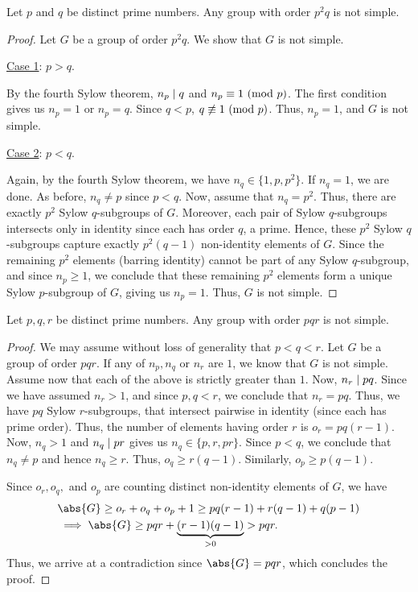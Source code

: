 \begin{theorem} \label{thm:simple-order-ppq}
    Let $p$ and $q$ be distinct prime numbers. Any group with order $p^2q$ is not simple.
\end{theorem}
\begin{proof}
    Let $G$ be a group of order $p^2q$. We show that $G$ is not simple.
    
    \underline{Case 1}: $p > q$.
    
    By the fourth Sylow theorem, $n_p \mid q$ and $n_p \equiv 1 \ (\mathrm{mod}\ p)$. The first condition gives us $n_p = 1$ or $n_p = q$. Since $q < p$, $q \not\equiv 1\ (\mathrm{mod}\ p)$. Thus, $n_p = 1$, and $G$ is not simple.
    
    \underline{Case 2}: $p < q$.
    
    Again, by the fourth Sylow theorem, we have $n_q \in \{1, p ,p^2\}$. If $n_q = 1$, we are done. As before, $n_q \neq p$ since $p < q$. Now, assume that $n_q = p^2$. Thus, there are exactly $p^2$ Sylow $q$-subgroups of $G$. Moreover, each pair of Sylow $q$-subgroups intersects only in identity since each has order $q$, a prime. Hence, these $p^2$ Sylow $q$-subgroups capture exactly $p^2(q-1)$ non-identity elements of $G$. Since the remaining $p^2$ elements (barring identity) cannot be part of any Sylow $q$-subgroup, and since $n_p \geq 1$, we conclude that these remaining  $p^2$ elements form a unique Sylow $p$-subgroup of $G$, giving us $n_p =1$. Thus, $G$ is not simple.
\end{proof}

\begin{theorem} \label{thm:simple-order-pqr}
    Let $p,q,r$ be distinct prime numbers. Any group with order $pqr$ is not simple.
\end{theorem}
\begin{proof}
    We may assume without loss of generality that $p < q < r$. Let $G$ be a group of order $pqr$. If any of $n_p,n_q$ or $n_r$ are $1$, we know that $G$ is not simple. Assume now that each of the above is strictly greater than $1$. Now, $n_r \mid pq$. Since we have assumed $n_r > 1$, and since $p,q < r$, we conclude that $n_r = pq$. Thus, we have $pq$ Sylow $r$-subgroups, that intersect pairwise in identity (since each has prime order). Thus, the number of elements having order $r$ is $o_r = pq(r-1)$. Now, $n_q > 1$ and $n_q \mid pr$ gives us $n_q \in \{p, r, pr\}$. Since $p<q$, we conclude that $n_q \neq p$ and hence $n_q \geq r$. Thus, $o_q \geq r(q-1)$. Similarly, $o_p \geq p(q-1)$.
    
    Since $o_r, o_q,$ and $o_p$ are counting distinct non-identity elements of $G$, we have
    \begin{align*}
        &\abs{G} \geq o_r + o_q + o_p + 1 \geq pq(r-1) + r(q-1) + q(p-1) \\
        &\implies \abs{G} \geq pqr + \underbrace{(r-1)(q-1)}_{>0} > pqr.
    \end{align*}
    Thus, we arrive at a contradiction since $\abs{G} = pqr$, which concludes the proof.
\end{proof}

